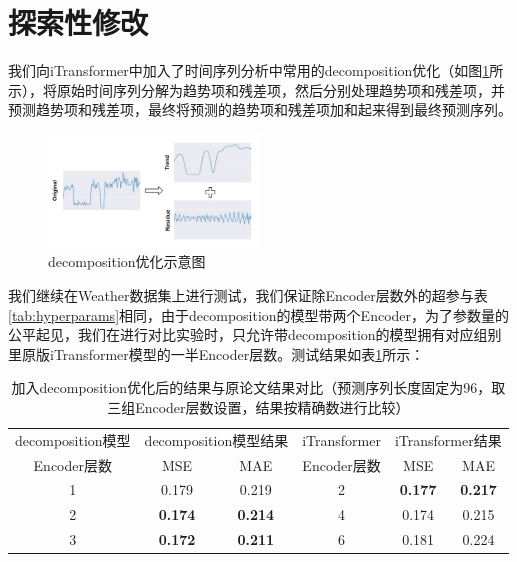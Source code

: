 \documentclass[twoside,12pt]{article}
\begin{document}
\section{探索性修改}

我们向iTransformer中加入了时间序列分析中常用的decomposition优化（如图\ref{fig:decomposition}所示），将原始时间序列分解为趋势项和残差项，然后分别处理趋势项和残差项，并预测趋势项和残差项，最终将预测的趋势项和残差项加和起来得到最终预测序列。

\begin{figure}[htbp]
  \centering
  \includegraphics[width=0.5\textwidth]{./pic/decomposition.png}
  \caption{decomposition优化示意图}
  \label{fig:decomposition}
\end{figure}

我们继续在Weather数据集上进行测试，我们保证除Encoder层数外的超参与表\ref{tab:hyperparams}相同，由于decomposition的模型带两个Encoder，为了参数量的公平起见，我们在进行对比实验时，只允许带decomposition的模型拥有对应组别里原版iTransformer模型的一半Encoder层数。测试结果如表\ref{tab:result_decomposition}所示：
\begin{table}[htbp]
  \caption{加入decomposition优化后的结果与原论文结果对比（预测序列长度固定为96，取三组Encoder层数设置，结果按精确数进行比较）}
  \label{tab:result_decomposition}
  \vspace{5pt}
  \centering
  \begin{tabular}{c|cc|c|cc}
    \toprule
    decomposition模型 & \multicolumn{2}{c|}{decomposition模型结果} & iTransformer   & \multicolumn{2}{c}{iTransformer结果}                                   \\
    \cmidrule(lr){2-3} \cmidrule(lr){5-6}
    Encoder层数       & MSE                                        & MAE            & Encoder层数                          & MSE            & MAE            \\
    \midrule
    1                 & 0.179                                      & 0.219          & 2                                    & \textbf{0.177} & \textbf{0.217} \\
    2                 & \textbf{0.174}                             & \textbf{0.214} & 4                                    & 0.174          & 0.215          \\
    3                 & \textbf{0.172}                             & \textbf{0.211} & 6                                    & 0.181          & 0.224          \\
    \bottomrule
  \end{tabular}
\end{table}
\end{document}
